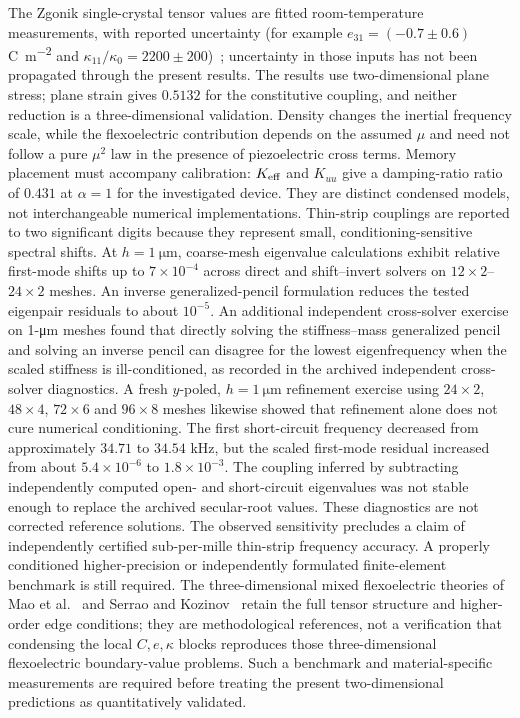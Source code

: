 The Zgonik single-crystal tensor values are fitted room-temperature
measurements, with reported uncertainty (for example
$e_{31}=(-0.7\pm0.6)$\,\si{\coulomb\per\square\meter} and
$\kappa_{11}/\kappa_0=2200\pm200$)~\cite{Zgonik1994}; uncertainty in
those inputs has not been propagated through the present results.
The results use two-dimensional plane stress; plane strain gives $0.5132$
for the constitutive coupling, and neither reduction is a three-dimensional
validation. Density changes the inertial frequency scale, while the flexoelectric
contribution depends on the assumed $\mu$ and need not follow a pure
$\mu^2$ law in the presence of piezoelectric cross terms. Memory placement must accompany calibration:
$K_{\rm eff}$ and $K_{uu}$ give a damping-ratio ratio of $0.431$ at $\alpha=1$
for the investigated device. They are distinct condensed
models, not interchangeable numerical implementations. Thin-strip couplings are reported to two significant digits because they
represent small, conditioning-sensitive spectral shifts. At $h=\SI{1}{\micro\meter}$,
coarse-mesh eigenvalue calculations exhibit relative first-mode shifts up
to $7\times10^{-4}$ across direct and shift--invert solvers on
$12\times2$--$24\times2$ meshes. An inverse generalized-pencil
formulation reduces the tested eigenpair residuals to about $10^{-5}$.
An additional independent cross-solver exercise on 1-\si{\micro\meter}
meshes found that directly solving the stiffness--mass generalized pencil
and solving an inverse pencil can disagree for the lowest eigenfrequency
when the scaled stiffness is ill-conditioned, as recorded in the
archived independent cross-solver diagnostics.
A fresh $y$-poled, $h=\SI{1}{\micro\meter}$ refinement exercise using
$24\times2$, $48\times4$, $72\times6$ and $96\times8$ meshes likewise
showed that refinement alone does not cure numerical conditioning.
The first short-circuit frequency decreased from approximately $34.71$ to
$34.54$ kHz, but the scaled first-mode residual increased from about
$5.4\times10^{-6}$ to $1.8\times10^{-3}$. The coupling inferred by
subtracting independently computed open- and short-circuit eigenvalues
was not stable enough to replace the archived secular-root values.
These diagnostics are not corrected reference solutions.
The observed sensitivity precludes a claim of independently certified
sub-per-mille thin-strip frequency accuracy. A properly conditioned
higher-precision or independently formulated finite-element benchmark is
still required. The three-dimensional mixed flexoelectric theories of
Mao et al.~\cite{MaoPurohitAravas2016} and Serrao and
Kozinov~\cite{SerraoKozinov2024} retain the full tensor structure and
higher-order edge conditions; they are methodological references, not a
verification that condensing the local $C,e,\kappa$ blocks reproduces those
three-dimensional flexoelectric boundary-value problems. Such a benchmark
and material-specific measurements are required before treating the present
two-dimensional predictions as quantitatively validated.

\FloatBarrier
